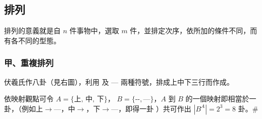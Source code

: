 \subsection{排列}\label{sec:b5-2-2}
\setcounter{equation}{0}

排列的意義就是自 $n$ 件事物中，選取 $m$ 件，並排定次序，依所加的條件不同，而有各不同的型態。

\subsubsection*{甲、重複排列}

\noindent
\begin{minipage}[c]{0.56\textwidth}
\begin{example}\label{ex:b5-2-7}
伏羲氏作八卦（見右圖），利用 \text{-{}-} 及 — 兩種符號，排成上中下三行而作成。

依映射觀點可令 $A = \{\text{上, 中, 下}\}$，
$B = \{\text{-{}-}, \text{—}\}$，$A$ 到 $B$ 的一個映射即相當於一卦，（例如上$\to$—，中$\to$\text{-{}-}，下$\to$—，即得一卦%
\begingroup\setlength{\fboxsep}{0pt}%
%
\endgroup%
）共可作出 $|B^A| = 2^3 = 8$ 卦。\hfill\#
\end{example}
\end{minipage}\hfill
